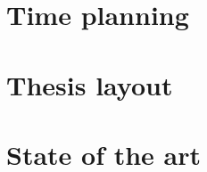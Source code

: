 \section{Time planning}
\label{sec:time-planning}


\section{Thesis layout}
\label{sec:layout}


\section{State of the art}
\label{chap:sota}



\cleardoublepage

\cleardoublepage